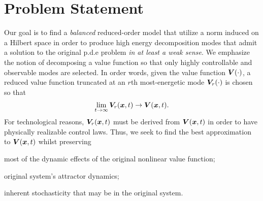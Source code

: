 \section{Problem Statement}
\label{sec:prob_state}
%
Our goal is to find a \textit{balanced} reduced-order model that utilize a norm induced on a Hilbert space in order to produce high energy  decomposition modes  that admit a  solution to the original p.d.e problem \textit{in at least a weak sense}. We emphasize the notion of decomposing a value function so that only highly controllable and observable modes are selected. In order words, given the value function $\bm{V}(\cdot)$, a reduced value function truncated at an $r$th most-energetic mode \ie $\bm{V}_r(\cdot)$  is chosen so that
%
\begin{align}
	\lim_{t\rightarrow \infty} \valuefunc_r(\state, t) \rightarrow \valuefunc(\state, t) .
	\label{eq:value_statement}
\end{align}
%
For technological reasons, $\bm{V}_r(\bm{x}, t) $ must be derived from $\bm{V}(\bm{x}, t)$ in order to have physically realizable control laws. Thus, we seek to find the best approximation to $\bm{V}(\bm{x}, t)$ whilst preserving 
%
\begin{inparaenum}[(a)]
	\item most of the dynamic effects of the original nonlinear value function;
	\item original system's attractor dynamics;
	\item inherent stochasticity that may be in the original system.
\end{inparaenum}
